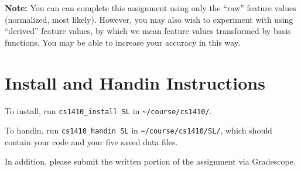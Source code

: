 \documentclass{article}
\begin{document}
\textbf{Note:}
You can can complete this assignment using only the ``raw'' feature values (normalized, most likely).
However, you may also wish to experiment with using ``derived'' feature values,
by which we mean feature values transformed by basis functions.
You may be able to increase your accuracy in this way.


\section{Install and Handin Instructions}
To install, run \verb|cs1410_install SL| in \verb|~/course/cs1410/|.

To handin, run \verb|cs1410_handin SL| in \verb|~/course/cs1410/SL/|,
which should contain your code and your five saved data files.

In addition, please submit the written portion of the assignment via Gradescope.
\end{document}
